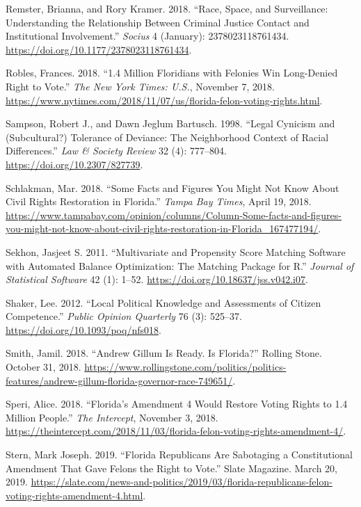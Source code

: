 \documentclass[
  12pt,
]{article}
\newlength{\cslhangindent}
\newenvironment{cslreferences}%
  {\setlength{\parindent}{0pt}%
  \everypar{\setlength{\hangindent}{\cslhangindent}}\ignorespaces}%
  {\par}
\begin{document}
\begin{cslreferences}
\leavevmode\hypertarget{ref-Remster2018}{}%
Remster, Brianna, and Rory Kramer. 2018. ``Race, Space, and Surveillance: Understanding the Relationship Between Criminal Justice Contact and Institutional Involvement.'' \emph{Socius} 4 (January): 2378023118761434. \url{https://doi.org/10.1177/2378023118761434}.

\leavevmode\hypertarget{ref-Robles2018}{}%
Robles, Frances. 2018. ``1.4 Million Floridians with Felonies Win Long-Denied Right to Vote.'' \emph{The New York Times: U.S.}, November 7, 2018. \url{https://www.nytimes.com/2018/11/07/us/florida-felon-voting-rights.html}.

\leavevmode\hypertarget{ref-Sampson1998}{}%
Sampson, Robert J., and Dawn Jeglum Bartusch. 1998. ``Legal Cynicism and (Subcultural?) Tolerance of Deviance: The Neighborhood Context of Racial Differences.'' \emph{Law \& Society Review} 32 (4): 777--804. \url{https://doi.org/10.2307/827739}.

\leavevmode\hypertarget{ref-Schlakman2018}{}%
Schlakman, Mar. 2018. ``Some Facts and Figures You Might Not Know About Civil Rights Restoration in Florida.'' \emph{Tampa Bay Times}, April 19, 2018. \url{https://www.tampabay.com/opinion/columns/Column-Some-facts-and-figures-you-might-not-know-about-civil-rights-restoration-in-Florida_167477194/}.

\leavevmode\hypertarget{ref-Sekhon2011}{}%
Sekhon, Jasjeet S. 2011. ``Multivariate and Propensity Score Matching Software with Automated Balance Optimization: The Matching Package for R.'' \emph{Journal of Statistical Software} 42 (1): 1--52. \url{https://doi.org/10.18637/jss.v042.i07}.

\leavevmode\hypertarget{ref-Shaker2012}{}%
Shaker, Lee. 2012. ``Local Political Knowledge and Assessments of Citizen Competence.'' \emph{Public Opinion Quarterly} 76 (3): 525--37. \url{https://doi.org/10.1093/poq/nfs018}.

\leavevmode\hypertarget{ref-Smith2018}{}%
Smith, Jamil. 2018. ``Andrew Gillum Is Ready. Is Florida?'' Rolling Stone. October 31, 2018. \url{https://www.rollingstone.com/politics/politics-features/andrew-gillum-florida-governor-race-749651/}.

\leavevmode\hypertarget{ref-Speri2018}{}%
Speri, Alice. 2018. ``Florida's Amendment 4 Would Restore Voting Rights to 1.4 Million People.'' \emph{The Intercept}, November 3, 2018. \url{https://theintercept.com/2018/11/03/florida-felon-voting-rights-amendment-4/}.

\leavevmode\hypertarget{ref-Stern2019}{}%
Stern, Mark Joseph. 2019. ``Florida Republicans Are Sabotaging a Constitutional Amendment That Gave Felons the Right to Vote.'' Slate Magazine. March 20, 2019. \url{https://slate.com/news-and-politics/2019/03/florida-republicans-felon-voting-rights-amendment-4.html}.


\end{cslreferences}
\end{document}
